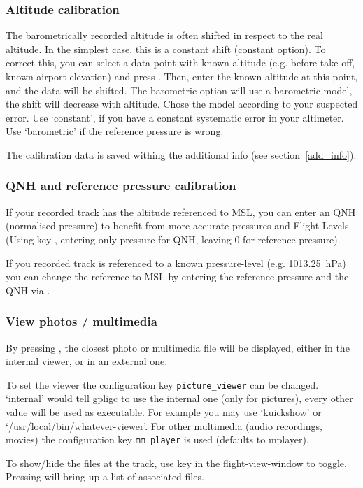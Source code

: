\subsubsection{Altitude calibration}
The barometrically recorded altitude is often shifted in respect to the real altitude.
In the simplest case, this is a constant shift (constant option).
To correct this, you can select a data point with known altitude
(e.g. before take-off, known airport elevation) and press .
Then, enter the known altitude at this point, and the data will be shifted.
The barometric option will use a barometric model, the shift will decrease with altitude.
Chose the model according to your suspected error. Use `constant', if you have a constant systematic error in your altimeter.
Use `barometric' if the reference pressure is wrong.

The calibration data is saved withing the additional info (see section~\ref{add_info}).


\subsubsection{QNH and reference pressure calibration}
If your recorded track has the altitude referenced to MSL, you can enter an QNH (normalised pressure) to benefit from more accurate pressures and Flight Levels.
(Using key , entering only pressure for QNH, leaving 0 for reference pressure).

If you recorded track is referenced to a known pressure-level (e.g. 1013.25~hPa) you can change the reference to MSL by entering the reference-pressure and the QNH via .


\subsubsection{View photos / multimedia}
By pressing , the closest photo or multimedia file will be displayed, either in
the internal viewer, or in an external one.

To set the viewer the configuration key \texttt{picture\_viewer} can be changed. `internal' would tell
gpligc to use the internal one (only for pictures), every other value will be used as executable. For example you may use
`kuickshow' or `/usr/local/bin/whatever-viewer'.
For other multimedia (audio recordings, movies) the configuration key \texttt{mm\_player} is used (defaults to mplayer).

To show/hide the files at the track, use key  in the flight-view-window to toggle. Pressing  will bring up a list of associated files.

